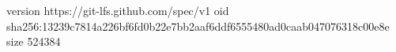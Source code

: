 version https://git-lfs.github.com/spec/v1
oid sha256:13239c7814a226bf6fd0b22e7bb2aaf6ddf6555480ad0caab047076318c00e8e
size 524384

